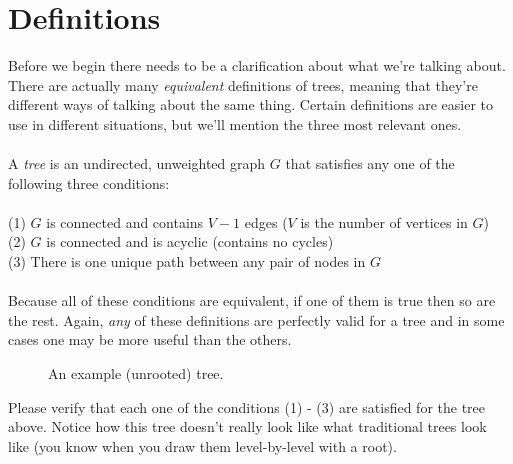 \documentclass[11pt]{article}
\theoremstyle{plain}
\theoremstyle{definition}
\begin{document}
\section{Definitions}
Before we begin there needs to be a clarification about what we're talking about. There are actually many \emph{equivalent} definitions of trees, meaning that they're different ways of talking about the same thing. Certain definitions are easier to use in different situations, but we'll mention the three most relevant ones.
\\\\
A \emph{tree} is an undirected, unweighted graph $G$ that satisfies any one of the following three conditions:
\\\\
(1) $G$ is connected and contains $V-1$ edges ($V$ is the number of vertices in $G$) \\
(2) $G$ is connected and is acyclic (contains no cycles) \\
(3) There is one unique path between any pair of nodes in $G$
\\\\
Because all of these conditions are equivalent, if one of them is true then so are the rest. Again, \emph{any} of these definitions are perfectly valid for a tree and in some cases one may be more useful than the others.
\begin{figure}[!ht]
\caption{An example (unrooted) tree.}
\centering
{}
\end{figure}
\newpage
\noindent
Please verify that each one of the conditions (1) - (3) are satisfied for the tree above. Notice how this tree doesn't really look like what traditional trees look like (you know when you draw them level-by-level with a root).
\end{document}

